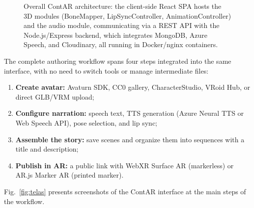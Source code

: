 \documentclass[conference]{IEEEtran}
\begin{document}
\begin{figure}[htbp]
  \caption{Overall ContAR architecture: the client-side React SPA hosts the 3D
    modules (BoneMapper, LipSyncController, AnimationController) and the audio
    module, communicating via a REST API with the Node.js/Express backend,
    which integrates MongoDB, Azure Speech, and Cloudinary, all running in
    Docker/nginx containers.}
  \label{fig:arquitetura}
\end{figure}

The complete authoring workflow spans four steps integrated into the same
interface, with no need to switch tools or manage intermediate files:
\begin{enumerate}
  \item \textbf{Create avatar:} Avaturn SDK, CC0 gallery, CharacterStudio,
    VRoid Hub, or direct GLB/VRM upload;
  \item \textbf{Configure narration:} speech text, TTS generation (Azure
    Neural TTS or Web Speech API), pose selection, and lip sync;
  \item \textbf{Assemble the story:} save scenes and organize them into
    sequences with a title and description;
  \item \textbf{Publish in AR:} a public link with WebXR Surface AR
    (markerless) or AR.js Marker AR (printed marker).
\end{enumerate}

Fig.~\ref{fig:telas} presents screenshots of the ContAR interface at the main
steps of the workflow.
\end{document}
